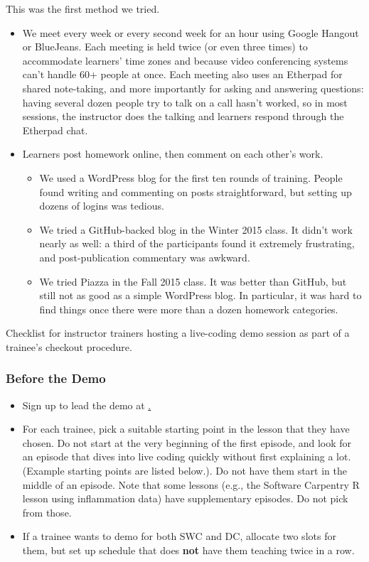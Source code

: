 This was the first method we tried.

\begin{itemize}
\item
  We meet every week or every second week for an hour using Google
  Hangout or BlueJeans. Each meeting is held twice (or even three times)
  to accommodate learners' time zones and because video conferencing
  systems can't handle 60+ people at once. Each meeting also uses an
  Etherpad for shared note-taking, and more importantly for asking and
  answering questions: having several dozen people try to talk on a call
  hasn't worked, so in most sessions, the instructor does the talking
  and learners respond through the Etherpad chat.
\item
  Learners post homework online, then comment on each other's work.

  \begin{itemize}
    \item
    We used a WordPress blog for the first ten rounds of training.
    People found writing and commenting on posts straightforward, but
    setting up dozens of logins was tedious.
  \item
    We tried a GitHub-backed blog in the Winter 2015 class. It didn't
    work nearly as well: a third of the participants found it extremely
    frustrating, and post-publication commentary was awkward.
  \item
    We tried Piazza in the Fall 2015 class. It was better than GitHub,
    but still not as good as a simple WordPress blog. In particular, it
    was hard to find things once there were more than a dozen homework
    categories.
  \end{itemize}
\end{itemize}


Checklist for instructor trainers hosting a live-coding demo session as
part of a trainee's checkout procedure.

\subsubsection{Before the Demo}\label{before-the-demo}

\begin{itemize}
\item
  Sign up to lead the demo at
  \href{http://pad.software-carpentry.org/teaching-demos}.
\item
  For each trainee, pick a suitable starting point in the lesson that
  they have chosen. Do not start at the very beginning of the first
  episode, and look for an episode that dives into live coding quickly
  without first explaining a lot. (Example starting points are listed
  below.). Do not have them start in the middle of an episode. Note that
  some lessons (e.g., the Software Carpentry R lesson using inflammation
  data) have supplementary episodes. Do not pick from those.
\item
  If a trainee wants to demo for both SWC and DC, allocate two slots for
  them, but set up schedule that does \textbf{not} have them teaching
  twice in a row.
\end{itemize}

